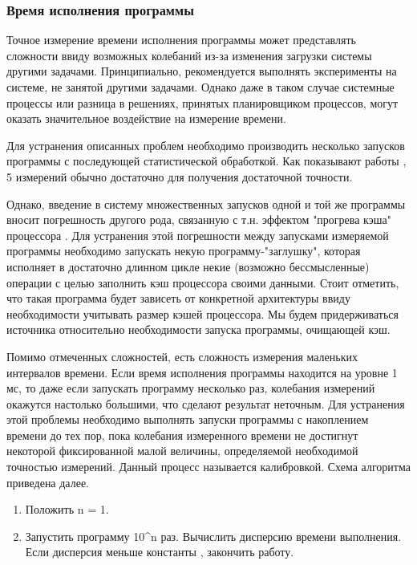 \subsubsection{Время исполнения программы}
Точное измерение времени исполнения программы может представлять сложности ввиду возможных колебаний из-за изменения загрузки системы другими задачами. Принципиально, рекомендуется выполнять эксперименты на системе, не занятой другими задачами. Однако даже в таком случае системные процессы или разница в решениях, принятых планировщиком процессов, могут оказать значительное воздействие на измерение времени.

Для устранения описанных проблем необходимо производить несколько запусков программы с последующей статистической обработкой. Как показывают работы \cite{runs-number}, 5 измерений обычно достаточно для получения достаточной точности.

Однако, введение в систему множественных запусков одной и той же программы вносит погрешность другого рода, связанную с т.н. эффектом "прогрева кэша" процессора \cite{cache-heating}. Для устранения этой погрешности между запусками измеряемой программы необходимо запускать некую программу-"заглушку", которая исполняет в достаточно длинном цикле некие (возможно бессмысленные) операции с целью заполнить кэш процессора своими данными. Стоит отметить, что такая программа будет зависеть от конкретной архитектуры ввиду необходимости учитывать размер кэшей процессора. Мы будем придерживаться источника \cite{cache-clearing} относительно необходимости запуска программы, очищающей кэш.

Помимо отмеченных сложностей, есть сложность измерения маленьких интервалов времени. Если время исполнения программы находится на уровне 1 мс, то даже если запускать программу несколько раз, колебания измерений окажутся настолько большими, что сделают результат неточным. Для устранения этой проблемы необходимо выполнять запуски программы с накоплением времени до тех пор, пока колебания измеренного времени не достигнут некоторой фиксированной малой величины, определяемой необходимой точностью измерений. Данный процесс называется калибровкой. Схема алгоритма приведена далее.

\begin{enumerate}
	\item Положить n = 1.
	\item Запустить программу 10^n раз. Вычислить дисперсию времени выполнения. Если дисперсия меньше константы \epsilon, закончить работу.
\end{enumerate}
